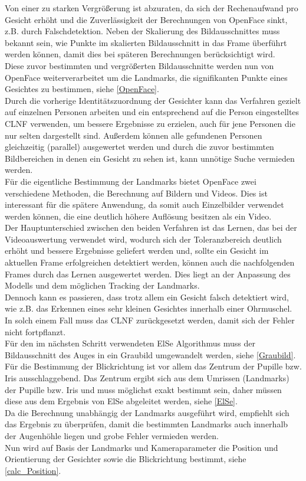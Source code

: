 Von einer zu starken Vergrößerung ist abzuraten, da sich der Rechenaufwand pro Gesicht erhöht und die Zuverlässigkeit der Berechnungen von OpenFace sinkt, z.B. durch Falschdetektion. Neben der Skalierung des Bildausschnittes muss bekannt sein, wie Punkte im skalierten Bildausschnitt in das Frame überführt werden können, damit dies bei späteren Berechnungen berücksichtigt wird.\\
Diese zuvor bestimmten und vergrößerten Bildausschnitte werden nun von OpenFace weiterverarbeitet um die Landmarks, die signifikanten Punkte eines Gesichtes zu bestimmen, siehe \autoref{OpenFace}.\\
Durch die vorherige Identitätszuordnung der Gesichter kann das Verfahren gezielt auf einzelnen Personen arbeiten und ein entsprechend auf die Person eingestelltes CLNF verwenden, um bessere Ergebnisse zu erzielen, auch für jene Personen die nur selten dargestellt sind. Außerdem können alle gefundenen Personen gleichzeitig (parallel) ausgewertet werden und durch die zuvor bestimmten Bildbereichen in denen ein Gesicht zu sehen ist, kann unnötige Suche vermieden werden.\\
Für die eigentliche Bestimmung der Landmarks bietet OpenFace zwei verschiedene Methoden, die Berechnung auf Bildern und Videos. Dies ist interessant für die spätere Anwendung, da somit auch Einzelbilder verwendet werden können, die eine deutlich höhere Auflösung besitzen als ein Video.\\
Der Hauptunterschied zwischen den beiden Verfahren ist das Lernen, das bei der Videoauswertung verwendet wird, wodurch sich der Toleranzbereich deutlich erhöht und bessere Ergebnisse geliefert werden und, sollte ein Gesicht im aktuellen Frame erfolgreichen detektiert werden, können auch die nachfolgenden Frames durch das Lernen ausgewertet werden. Dies liegt an der Anpassung des Modells und dem möglichen Tracking der Landmarks.\\
Dennoch kann es passieren, dass trotz allem ein Gesicht falsch detektiert wird, wie z.B. das Erkennen eines sehr kleinen Gesichtes innerhalb einer Ohrmuschel. In solch einem Fall muss das CLNF zurückgesetzt werden, damit sich der Fehler nicht fortpflanzt.\\
Für den im nächsten Schritt verwendeten ElSe Algorithmus muss der Bildausschnitt des Auges in ein Graubild umgewandelt werden, siehe \autoref{Graubild}.\\
Für die Bestimmung der Blickrichtung ist vor allem das Zentrum der Pupille bzw. Iris ausschlaggebend. Das Zentrum ergibt sich aus dem Umrissen (Landmarks) der Pupille bzw. Iris und muss möglichst exakt bestimmt sein, daher müssen diese aus dem Ergebnis von ElSe abgeleitet werden, siehe \autoref{ElSe}.\\
Da die Berechnung unabhängig der Landmarks ausgeführt wird, empfiehlt sich das Ergebnis zu überprüfen, damit die bestimmten Landmarks auch innerhalb der Augenhöhle liegen und grobe Fehler vermieden werden.\\
Nun wird auf Basis der Landmarks und Kameraparameter die Position und Orientierung der Gesichter sowie die Blickrichtung bestimmt, siehe \autoref{calc_Position}.
